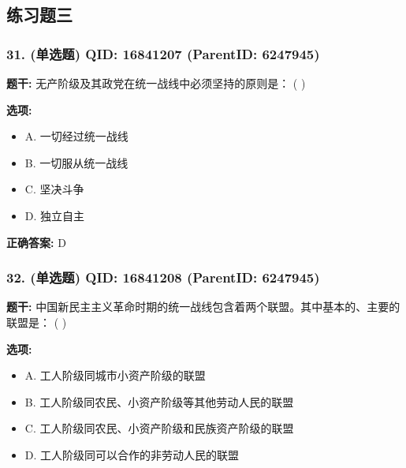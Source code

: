\documentclass[12pt,UTF8]{ctexart}
\begin{document}
\subsection*{练习题三}

\subsubsection*{31. (单选题) \small QID: 16841207 (ParentID: 6247945)}

\textbf{题干:}
无产阶级及其政党在统一战线中必须坚持的原则是： ( )



\textbf{选项:}
\begin{itemize}[leftmargin=*]

  \item A. 一切经过统一战线

  \item B. 一切服从统一战线

  \item C. 坚决斗争

  \item D. 独立自主

\end{itemize}

\textbf{正确答案:}
D

\vspace{0.3em}\hrulefill\vspace{0.7em}

\subsubsection*{32. (单选题) \small QID: 16841208 (ParentID: 6247945)}

\textbf{题干:}
中国新民主主义革命时期的统一战线包含着两个联盟。其中基本的、主要的联盟是： ( )



\textbf{选项:}
\begin{itemize}[leftmargin=*]

  \item A. 工人阶级同城市小资产阶级的联盟

  \item B. 工人阶级同农民、小资产阶级等其他劳动人民的联盟

  \item C. 工人阶级同农民、小资产阶级和民族资产阶级的联盟

  \item D. 工人阶级同可以合作的非劳动人民的联盟

\end{itemize}
\end{document}
